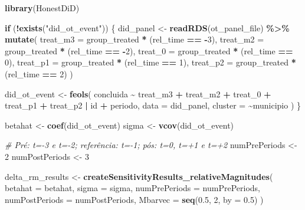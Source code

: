 \documentclass[
]{article}
\newenvironment{Shaded}{\begin{snugshade}}{\end{snugshade}}
\newcommand{\AttributeTok}[1]{\textcolor[rgb]{0.13,0.29,0.53}{#1}}
\newcommand{\CommentTok}[1]{\textcolor[rgb]{0.56,0.35,0.01}{\textit{#1}}}
\newcommand{\ControlFlowTok}[1]{\textcolor[rgb]{0.13,0.29,0.53}{\textbf{#1}}}
\newcommand{\DecValTok}[1]{\textcolor[rgb]{0.00,0.00,0.81}{#1}}
\newcommand{\FloatTok}[1]{\textcolor[rgb]{0.00,0.00,0.81}{#1}}
\newcommand{\FunctionTok}[1]{\textcolor[rgb]{0.13,0.29,0.53}{\textbf{#1}}}
\newcommand{\NormalTok}[1]{#1}
\newcommand{\OtherTok}[1]{\textcolor[rgb]{0.56,0.35,0.01}{#1}}
\newcommand{\SpecialCharTok}[1]{\textcolor[rgb]{0.81,0.36,0.00}{\textbf{#1}}}
\newcommand{\StringTok}[1]{\textcolor[rgb]{0.31,0.60,0.02}{#1}}
\begin{document}
\begin{Shaded}
\begin{Highlighting}[]
\FunctionTok{library}\NormalTok{(HonestDiD)}

\ControlFlowTok{if}\NormalTok{ (}\SpecialCharTok{!}\FunctionTok{exists}\NormalTok{(}\StringTok{"did\_ot\_event"}\NormalTok{)) \{}
\NormalTok{  did\_panel }\OtherTok{\textless{}{-}} \FunctionTok{readRDS}\NormalTok{(ot\_panel\_file) }\SpecialCharTok{\%\textgreater{}\%}
    \FunctionTok{mutate}\NormalTok{(}
      \AttributeTok{treat\_m3 =}\NormalTok{ group\_treated }\SpecialCharTok{*}\NormalTok{ (rel\_time }\SpecialCharTok{==} \SpecialCharTok{{-}}\DecValTok{3}\NormalTok{),}
      \AttributeTok{treat\_m2 =}\NormalTok{ group\_treated }\SpecialCharTok{*}\NormalTok{ (rel\_time }\SpecialCharTok{==} \SpecialCharTok{{-}}\DecValTok{2}\NormalTok{),}
      \AttributeTok{treat\_0  =}\NormalTok{ group\_treated }\SpecialCharTok{*}\NormalTok{ (rel\_time }\SpecialCharTok{==} \DecValTok{0}\NormalTok{),}
      \AttributeTok{treat\_p1 =}\NormalTok{ group\_treated }\SpecialCharTok{*}\NormalTok{ (rel\_time }\SpecialCharTok{==} \DecValTok{1}\NormalTok{),}
      \AttributeTok{treat\_p2 =}\NormalTok{ group\_treated }\SpecialCharTok{*}\NormalTok{ (rel\_time }\SpecialCharTok{==} \DecValTok{2}\NormalTok{)}
\NormalTok{    )}

\NormalTok{  did\_ot\_event }\OtherTok{\textless{}{-}} \FunctionTok{feols}\NormalTok{(}
\NormalTok{    concluida }\SpecialCharTok{\textasciitilde{}}\NormalTok{ treat\_m3 }\SpecialCharTok{+}\NormalTok{ treat\_m2 }\SpecialCharTok{+}\NormalTok{ treat\_0 }\SpecialCharTok{+}\NormalTok{ treat\_p1 }\SpecialCharTok{+}\NormalTok{ treat\_p2 }\SpecialCharTok{|}\NormalTok{ id }\SpecialCharTok{+}\NormalTok{ periodo,}
    \AttributeTok{data =}\NormalTok{ did\_panel,}
    \AttributeTok{cluster =} \SpecialCharTok{\textasciitilde{}}\NormalTok{municipio}
\NormalTok{  )}
\NormalTok{\}}

\NormalTok{betahat }\OtherTok{\textless{}{-}} \FunctionTok{coef}\NormalTok{(did\_ot\_event)}
\NormalTok{sigma }\OtherTok{\textless{}{-}} \FunctionTok{vcov}\NormalTok{(did\_ot\_event)}

\CommentTok{\# Pré: t={-}3 e t={-}2; referência: t={-}1; pós: t=0, t=+1 e t=+2}
\NormalTok{numPrePeriods }\OtherTok{\textless{}{-}} \DecValTok{2}
\NormalTok{numPostPeriods }\OtherTok{\textless{}{-}} \DecValTok{3}

\NormalTok{delta\_rm\_results }\OtherTok{\textless{}{-}} \FunctionTok{createSensitivityResults\_relativeMagnitudes}\NormalTok{(}
  \AttributeTok{betahat =}\NormalTok{ betahat,}
  \AttributeTok{sigma =}\NormalTok{ sigma,}
  \AttributeTok{numPrePeriods =}\NormalTok{ numPrePeriods,}
  \AttributeTok{numPostPeriods =}\NormalTok{ numPostPeriods,}
  \AttributeTok{Mbarvec =} \FunctionTok{seq}\NormalTok{(}\FloatTok{0.5}\NormalTok{, }\DecValTok{2}\NormalTok{, }\AttributeTok{by =} \FloatTok{0.5}\NormalTok{)}
\NormalTok{)}


\end{Highlighting}
\end{Shaded}
\end{document}
